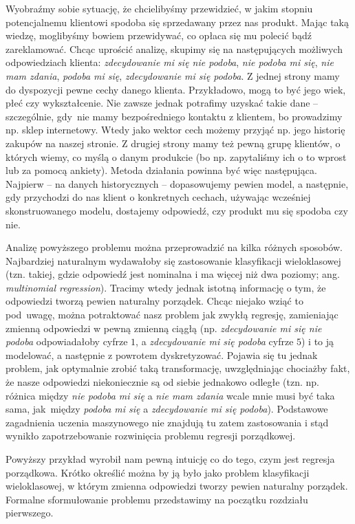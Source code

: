 \documentclass{mini}
\begin{document}
Wyobraźmy sobie sytuację, że chcielibyśmy przewidzieć, w jakim stopniu potencjalnemu klientowi spodoba się sprzedawany przez nas produkt. Mając taką wiedzę, moglibyśmy bowiem przewidywać, co opłaca się mu polecić bądź zareklamować. Chcąc uprościć analizę, skupimy się na następujących możliwych odpowiedziach klienta: \textit{zdecydowanie mi się nie podoba}, \textit{nie podoba mi się}, \textit{nie mam zdania}, \textit{podoba mi się}, \textit{zdecydowanie mi się podoba}. Z jednej strony mamy do dyspozycji pewne cechy danego klienta. Przykładowo, mogą to być jego wiek, płeć czy wykształcenie. Nie zawsze jednak potrafimy uzyskać takie dane -- szczególnie, gdy~nie mamy bezpośredniego kontaktu z klientem, bo prowadzimy np. sklep internetowy. Wtedy jako wektor cech możemy przyjąć np. jego historię zakupów na naszej stronie. Z drugiej strony mamy też pewną grupę klientów, o których wiemy, co myślą o danym produkcie (bo np. zapytaliśmy ich o to wprost lub za pomocą ankiety). Metoda działania powinna być więc następująca. Najpierw -- na danych historycznych -- dopasowujemy pewien model, a następnie, gdy przychodzi do nas klient o konkretnych cechach, używając wcześniej skonstruowanego modelu, dostajemy odpowiedź, czy produkt mu się spodoba czy nie. 

Analizę powyższego problemu można przeprowadzić na kilka różnych sposobów. Najbardziej naturalnym wydawałoby się zastosowanie klasyfikacji wieloklasowej (tzn. takiej, gdzie odpowiedź jest nominalna i ma więcej niż dwa poziomy; ang. \textit{multinomial regression}). Tracimy wtedy jednak istotną informację o tym, że odpowiedzi tworzą pewien naturalny porządek. Chcąc niejako wziąć to pod~uwagę, można potraktować nasz problem jak zwykłą regresję, zamieniając zmienną odpowiedzi w pewną zmienną ciągłą (np. \textit{zdecydowanie mi się nie podoba} odpowiadałoby cyfrze $1$, a \textit{zdecydowanie mi się podoba} cyfrze $5$) i to ją modelować, a następnie z powrotem dyskretyzować. Pojawia się tu jednak problem, jak optymalnie zrobić taką transformację, uwzględniając chociażby fakt, że nasze odpowiedzi niekoniecznie są od siebie jednakowo odległe (tzn. np. różnica między \textit{nie podoba mi się} a \textit{nie mam zdania} wcale mnie musi być taka sama, jak~między \textit{podoba mi się} a \textit{zdecydowanie mi się podoba}). Podstawowe zagadnienia uczenia maszynowego nie znajdują tu zatem zastosowania i stąd wynikło zapotrzebowanie rozwinięcia problemu regresji porządkowej. 

Powyższy przykład wyrobił nam pewną intuicję co do tego, czym jest regresja porządkowa. Krótko określić można by ją było jako problem klasyfikacji wieloklasowej, w którym zmienna odpowiedzi tworzy pewien naturalny porządek. Formalne sformułowanie problemu przedstawimy na początku rozdziału pierwszego.
\end{document}
